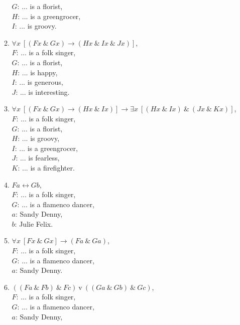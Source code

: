 \documentclass[a4paper,12pt]{article}
\newcommand{\ra}{\rightarrow}
\newcommand{\lra}{\leftrightarrow}
\newcommand{\tv}{ \ \textrm{v} \ }
\newcommand{\ta}{ \ \& \ }
\newcommand{\all}{\forall}
\newcommand{\ex}{\exists}
\begin{document}
\begin{enumerate}[label=\arabic*,leftmargin=*]
\begin{enumerate}[label=(\roman*),leftmargin=*]
                    $G$: ... is a florist,\\
                    $H$: ... is a greengrocer,\\
                    $I$: ... is groovy.
                \item $\all x \ [(Fx \ta Gx) \ra (Hx \ta Ix \ta Jx)]$,\\
                    $F$: ... is a folk singer,\\
                    $G$: ... is a florist,\\
                    $H$: ... is happy,\\
                    $I$: ... is generous,\\
                    $J$: ... is interesting.
                \item $\all x \ [(Fx \ta Gx) \ra (Hx \ta Ix)] \ra \ex x \ [(Hx \ta Ix) \ta (Jx \ta Kx)]$,\\
                    $F$: ... is a folk singer,\\
                    $G$: ... is a florist,\\
                    $H$: ... is groovy,\\
                    $I$: ... is a greengrocer,\\
                    $J$: ... is fearless,\\
                    $K$: ... is a firefighter.
                \item $Fa \lra Gb$,\\
                    $F$: ... is a folk singer,\\
                    $G$: ... is a flamenco dancer,\\
                    $a$: Sandy Denny,\\
                    $b$: Julie Felix.
                \item $\all x \ [Fx \ta Gx] \ra (Fa \ta Ga)$,\\
                    $F$: ... is a folk singer,\\
                    $G$: ... is a flamenco dancer,\\
                    $a$: Sandy Denny.
                \item $((Fa \ta Fb) \ta Fc) \tv ((Ga \ta Gb) \ta Gc)$,\\
                    $F$: ... is a folk singer,\\
                    $G$: ... is a flamenco dancer,\\
                    $a$: Sandy Denny,\\

\end{enumerate}
\end{enumerate}
\end{document}
